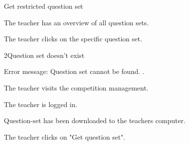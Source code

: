 \begin{uc}{Get restricted question set}


    \begin{uc-mss}
    \item The teacher has an overview of all question sets.
    \item The teacher clicks on the specific question set.
    \end{uc-mss}

    \begin{uc-ext}

        \begin{uc-fail}{2}{Question set doesn't exist}
        \item Error message: Question set cannot be found.
            .
        \end{uc-fail}

    \end{uc-ext}

    \begin{uc-pre}
    \item The teacher visits the competition management.
        \item The teacher is logged in.
    \end{uc-pre}

    \begin{uc-post}
    \item Question-set has been downloaded to the teachers computer.
    \end{uc-post}

    \begin{uc-trig}
        The teacher clicks on "Get question set".
    \end{uc-trig}

\end{uc}
